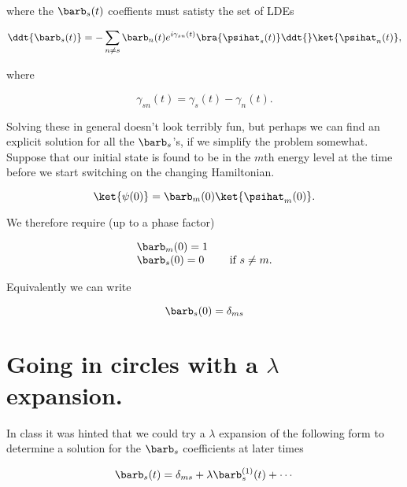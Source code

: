 where the $\barb_s(t)$ coeffients must satisty the set of LDEs 

\begin{equation}\label{eqn:adiabaticApprox:50}
\ddt{\barb_s(t)} = - \sum_{n \ne s} \barb_n(t) e^{i \gamma_{sn}(t) } \bra{\psihat_s(t)} \ddt{} \ket{\psihat_n(t)},
\end{equation}

where

\begin{equation}\label{eqn:adiabaticApprox:70}
\gamma_{sn}(t) = \gamma_{s}(t) - \gamma_{n}(t).
\end{equation}

Solving these in general doesn't look terribly fun, but perhaps we can find an explicit solution for all the $\barb_s$'s, if we simplify the problem somewhat.  Suppose that our initial state is found to be in the $m$th energy level at the time before we start switching on the changing Hamiltonian.

\begin{equation}\label{eqn:adiabaticApprox:90}
\ket{\psi(0)} = \barb_m(0) \ket{\psihat_m(0)}.
\end{equation}

We therefore require (up to a phase factor)

\begin{equation}\label{eqn:adiabaticApprox:110}
\begin{array}{l l}
\barb_m(0) = 1 & \\
\barb_s(0) = 0 & \quad \mbox{if $s \ne m$}.
\end{array}
\end{equation}

Equivalently we can write

\begin{equation}\label{eqn:adiabaticApprox:130}
\barb_s(0) = \delta_{ms}
\end{equation}

\section{Going in circles with a $\lambda$ expansion.}

In class it was hinted that we could try a $\lambda$ expansion of the following form to determine a solution for the $\barb_s$ coefficients at later times

\begin{equation}\label{eqn:adiabaticApprox:150}
\barb_s(t) = \delta_{ms} + \lambda \barb^{(1)}_s(t) + \cdots
\end{equation}

